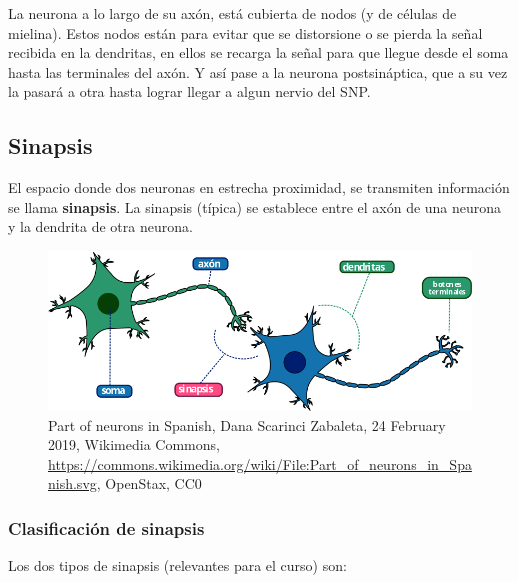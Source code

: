 La neurona a lo largo de su axón, está cubierta de nodos (y de células de mielina). Estos nodos están para evitar que se distorsione o se pierda la señal recibida en la dendritas, en ellos se recarga la señal para que llegue desde el soma hasta las terminales del axón. Y así pase a la neurona postsináptica, que a su vez la pasará a otra hasta lograr llegar a algun nervio del SNP. 


\subsection{Sinapsis}

 El espacio donde dos neuronas en estrecha proximidad, se transmiten información se llama \textbf{sinapsis}. La sinapsis (típica) se establece entre el axón de una neurona y la dendrita de otra neurona. \parencite{sistemaNervioso}%



\begin{figure}[h]
 \centering
 \includegraphics[scale=0.5]{../Figuras/Part_of_neurons_in_Spanish.png}
 \caption{Part of neurons in Spanish, Dana Scarinci Zabaleta, 24 February 2019, Wikimedia Commons, \url{https://commons.wikimedia.org/wiki/File:Part_of_neurons_in_Spanish.svg}, OpenStax, CC0}
 \label{fig:sinapsisN}
\end{figure}


\subsubsection{Clasificación de sinapsis}

Los dos tipos de sinapsis (relevantes para el curso) son:

